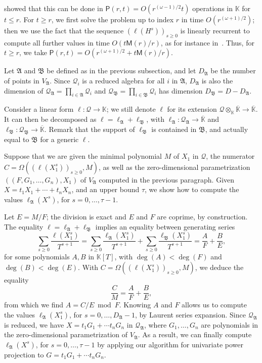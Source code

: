 \documentclass[final,1p,times,authoryear]{elsarticle}
\newcommand{\lf}{X}
\newcommand{\residueI}{\mathscr{Q}}
\def\M {\ensuremath{\mathsf{M}}}
\def\PP {\ensuremath{\mathsf{P}}}
\def\K{\mathbb{K}}
\def\K {\ensuremath{\mathbb{K}}}
\def\Kbar {{\ensuremath{\overline{\mathbb{K}}}}}
\begin{document}
\citet[Theorem~4]{Shoup94} showed that this can be done in
$\PP(r,t)=O(r^{(\omega-1)/2} t)$ operations in $\K$ for $t \le r$. For
$t \ge r$, we first solve the problem up to index $r$ in time
$O(r^{(\omega+1)/2})$; then we use the fact that the sequence 
$(\ell(H^s))_{s \ge 0}$
is linearly recurrent to compute all further values in time
$O(t\M(r)/r)$, as for instance in~\citep[Proposition~1]{BoFlSaSc06}.
Thus, for $t \ge r$, we take $\PP(r,t)=O(r^{(\omega+1)/2} +
t\M(r)/r)$.

\medskip

Let $\mathfrak{A}$ and $\mathfrak{B}$ be defined as in the previous 
subsection, and let $D_{\mathfrak{A}}$ be the number of points in
$V_{\mathfrak{A}}$. Since $\residueI_i$ is a reduced algebra for all
$i$ in $\mathfrak{A}$, $D_\mathfrak{A}$ is also the dimension of
$\residueI_\mathfrak{A} = \prod_{i \in \mathfrak{A}}
\residueI_i$ and $\residueI_\mathfrak{B}=\prod_{i \in \mathfrak{B}}
\residueI_i$ has dimension $D_{\mathfrak{B}}=D-D_{\mathfrak{A}}$.

Consider a linear form $\ell: \residueI \to \K$; we still denote
$\ell$ for its extension $\residueI \otimes_\K \Kbar \to \Kbar$.  It
can then be decomposed as $\ell= \ell_{\mathfrak{A}} +
\ell_{\mathfrak{B}}$, with $\ell_\mathfrak{A}: \residueI_\mathfrak{A}
\to \Kbar$ and $\ell_\mathfrak{B}: \residueI_\mathfrak{B} \to \Kbar$.
Remark that the support of $\ell_\mathfrak{B}$ is contained in
$\mathfrak{B}$, and actually equal to $\mathfrak{B}$ for a generic
$\ell$.

Suppose that we are given the minimal polynomial $M$ of $X_1$ in
$\residueI$, the numerator $C=\Omega( (\ell(X_1^s))_{s \ge 0}, M)$, as
well as the zero-dimensional parametrization $((F,G_1,\dots,G_n),X_1)$
of $V_\mathfrak{A}$ computed in the previous paragraph.  Given
$\lf=t_1 X_1 + \cdots+ t_n X_n$, and an upper bound $\tau$, we show
how to compute the values $\ell_\mathfrak{A}(\lf^s)$, for
$s=0,\dots,\tau-1$.

Let $E=M/F$; the division is exact and  $E$ and $F$ are coprime, by construction.
The equality $\ell= \ell_{\mathfrak{A}} + \ell_{\mathfrak{B}}$ implies
an equality between generating series
\[
  \sum_{s \ge 0} \frac{\ell(X_1^s)}{T^{s+1}} = \sum_{s \ge 0}\frac{\ell_\mathfrak{A}(X_1^s)}{T^{s+1}}  
                                              +\sum_{s \ge 0} \frac{\ell_\mathfrak{B}(X_1^s)}{T^{s+1}}
                                             = \frac{A}{F} + \frac{B}{E},
\]
for some polynomials $A,B$ in $\K[T]$, with $\deg(A) < \deg(F)$ and
$\deg(B) < \deg(E)$. With  $C=\Omega( (\ell(X_1^s))_{s \ge 0}, M)$, we deduce the equality
$$\frac{C}{M}=\frac{A}{F} + \frac{B}{E},$$ from which we find $A = C/E
\bmod F$. Knowing $A$ and $F$ allows us to compute the values
$\ell_\mathfrak{A}(X_1^s)$, for $s=0,\dots,D_\mathfrak{A}-1$, by
Laurent series expansion.  Since $\residueI_\mathfrak{A}$ is reduced,
we have $\lf = t_1 G_1 + \cdots t_n G_n$ in $\residueI_\mathfrak{A}$,
where $G_1,\dots,G_n$ are polynomials in the zero-dimensional
parametrization of $V_\mathfrak{A}$. As a result, we can finally
compute $\ell_\mathfrak{A}(\lf^s)$, for $s=0,\dots,\tau-1$ by
applying our algorithm for univariate power projection to $G=t_1 G_1 + \cdots t_n G_n$.
\end{document}
